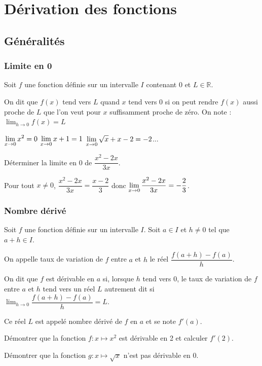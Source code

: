 \documentclass[french]{book}
\newcommand{\R}{\mathbb {R}}
\newcommand{\ds}{\displaystyle}
\newcommand{\limo}[1][x]{\ds\lim_{#1\rightarrow 0}}
\begin{document}
\tableofcontents
\chapter{Dérivation des fonctions}
\section{Généralités}
\subsection{Limite en 0}
\begin{defn}
Soit $f$ une fonction définie sur un intervalle $I$ contenant 0 et $L \in \R$.

On dit que $f(x)$ tend vers $L$ quand $x$ tend vers 0 si on peut rendre $f(x)$ aussi proche de $L$ que l'on veut pour $x$ suffisamment proche de zéro. On note : $\limo[h] f(x)=L$
\end{defn}

\begin{exemple}
$\ds \limo[x]x^{2}=0$ \hspace{1em} $\ds \limo[x]x+1=1$ \hspace{1em} $\ds \limo[x]\sqrt{x}+x-2=-2$...

Déterminer la limite en 0 de $\dfrac{x^{2}-2x}{3x}$.
\end{exemple}


Pour tout $x\neq 0$, $\dfrac{x^{2}-2x}{3x}=\dfrac{x-2}{3}$ donc $\ds \limo[x]\dfrac{x^{2}-2x}{3x}=-\dfrac{2}{3}$.

%
\subsection{Nombre dérivé}
\begin{defn}
Soit $f$ une fonction définie sur un intervalle $I$. Soit $a \in I$ et $h \neq 0$ tel que $a+h \in I$.

On appelle taux de variation de $f$ entre $a$ et $h$ le réel $\dfrac{f(a+h)-f(a)}{h}$.

On dit que $f$ est dérivable en $a$ si, lorsque $h$ tend vers 0, le taux de variation de $f$ entre $a$ et $h$ tend vers un réel $L$ autrement dit si $\ds \lim_{h\rightarrow 0}\dfrac{f(a+h)-f(a)}{h}=L$.

Ce réel $L$ est appelé nombre dérivé de $f$ en $a$ et se note $f'(a)$.
\end{defn}

\begin{exemple}
Démontrer que la fonction $f : x \longmapsto x^{2}$ est dérivable en 2 et calculer $f'(2)$.

Démontrer que la fonction $g : x \longmapsto \sqrt{x}$ n'est pas dérivable en 0.
\end{exemple}
\end{document}
